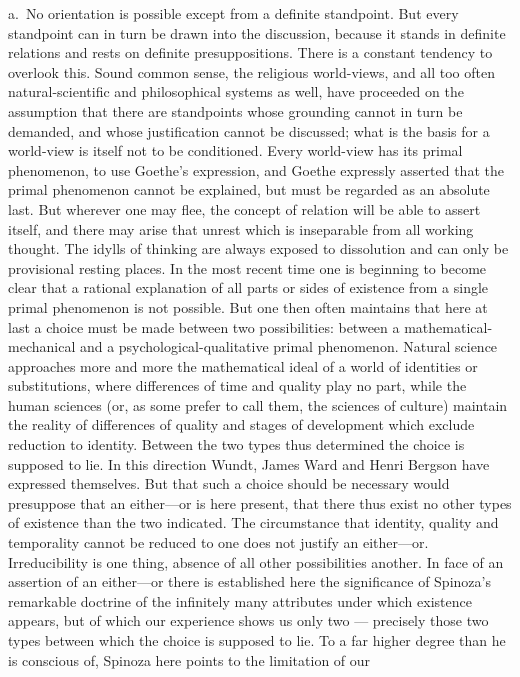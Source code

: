 \documentclass[12pt]{article}
\newcommand{\opage}[1]{\marginnote{\footnotesize\textit{[#1]}}}
\begin{document}
a.~No orientation is possible except from a definite standpoint. But every
standpoint can in turn be drawn into the discussion, because it stands in
definite relations and rests on definite presuppositions. There is a
constant tendency to overlook this. Sound common sense, the religious
world-views, and all too often natural-scientific and philosophical systems
as well, have proceeded on the assumption that there are standpoints whose
grounding cannot in turn be demanded, and whose justification cannot be
discussed; what is the basis for a world-view is itself not to be
conditioned. Every world-view has its primal phenomenon, to use Goethe's
expression, and Goethe expressly asserted that the primal phenomenon cannot
be explained, but must be regarded as an absolute last. But wherever one may
flee, the concept of relation will be able to assert itself, and there may
arise that unrest which is inseparable from all working thought. The idylls
of thinking are always exposed to dissolution and can only be provisional
resting places. In the most recent time one is beginning to become clear
that a rational explanation of all parts or sides of existence from a single
primal phenomenon is not possible. But one then often maintains that here at
last a choice must be made between two possibilities: between a
mathematical-mechanical and a psychological-qualitative primal phenomenon.
Natural science approaches more and more the mathematical ideal of a world
of identities or substitutions, where differences of time and \opage{100}quality play
no part, while the human sciences (or, as some prefer to call them, the
sciences of culture) maintain the reality of differences of quality and
stages of development which exclude reduction to identity. Between the two
types thus determined the choice is supposed to lie. In this direction Wundt,
James Ward and Henri Bergson have expressed themselves. But that such a
choice should be necessary would presuppose that an either---or is here
present, that there thus exist no other types of existence than the two
indicated. The circumstance that identity, quality and temporality cannot be
reduced to one does not justify an either---or. Irreducibility is one thing,
absence of all other possibilities another. In face of an assertion of an
either---or there is established here the significance of Spinoza's
remarkable doctrine of the infinitely many attributes under which existence
appears, but of which our experience shows us only two --- precisely those
two types between which the choice is supposed to lie. To a far higher
degree than he is conscious of, Spinoza here points to the limitation of our
\end{document}
